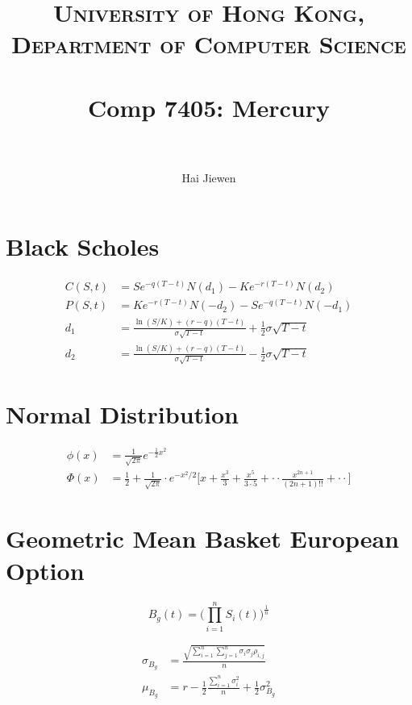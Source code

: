 \documentclass[paper=a4, fontsize=11pt, twocolumn]{scrartcl} %
\title{	
\normalfont \normalsize 
\textsc{University of Hong Kong, Department of Computer Science} \\ [25pt] %
\horrule{0.5pt} \\[0.4cm] %
\huge Comp 7405: Mercury \\ %
\horrule{2pt} \\[0.5cm] %
}
\author{
Hai Jiewen
} %
\date{} %
\numberwithin{equation}{section} %
\numberwithin{figure}{section} %
\numberwithin{table}{section} %
\begin{document}
\maketitle %


\section{Black Scholes}

\begin{equation}
	\begin{split}
		C(S,t) & = Se^{-q(T-t)}N(d_1)-Ke^{-r(T-t)}N(d_2) \\
		P(S,t) & = Ke^{-r(T-t)}N(-d_2)-Se^{-q(T-t)}N(-d_1) \\
		d_1 & = \frac{\ln(S/K)+(r-q)(T-t)}{\sigma\sqrt{T-t}} + \frac{1}{2}\sigma\sqrt{T-t} \\
		d_2 & = \frac{\ln(S/K)+(r-q)(T-t)}{\sigma\sqrt{T-t}} - \frac{1}{2}\sigma\sqrt{T-t}
	\end{split}
\end{equation}

\section{Normal Distribution}
\begin{equation}
	\begin{split}
	\phi(x)&=\frac{1}{\sqrt{2\pi}}e^{-\frac{1}{2}x^2}\\
	\Phi(x)&=\frac{1}{2}+\frac{1}{\sqrt{2\pi}}\cdot e^{-x^2/2}\big[x+\frac{x^3}{3}+\frac{x^5}{3\cdot 5}+\cdot \cdot \frac{x^{2n+1}}{(2n+1)!!}+\cdot \cdot \big]
\end{split}
\end{equation}

\section{Geometric Mean Basket European Option}
\begin{equation}
	B_g(t)=\big(\prod_{i=1}^n S_i(t)\big)^\frac{1}{n}
\end{equation}

\begin{equation}
	\begin{split}
		\sigma_{B_g} & = \frac{\sqrt{\sum_{i=1}^{n}\sum_{j=1}^{n}\sigma_i\sigma_j\rho_{i,j}}}{n} \\
		\mu_{B_g} & = r-\frac{1}{2}\frac{\sum_{i=1}^{n}\sigma_i^2}{n}+\frac{1}{2}\sigma^2_{B_g}
	\end{split}
\end{equation}
\end{document}
